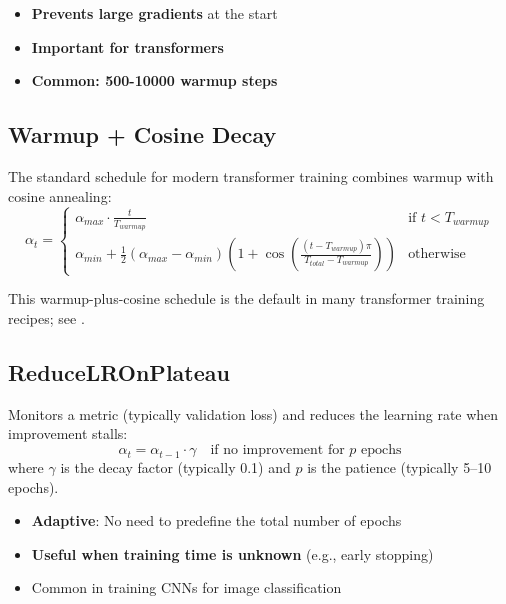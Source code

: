 \begin{itemize}
    \item \textbf{Prevents large gradients} at the start
    \item \textbf{Important for transformers}
    \item \textbf{Common: 500-10000 warmup steps}
\end{itemize}

\subsection{Warmup + Cosine Decay}

The standard schedule for modern transformer training combines warmup with cosine annealing:
\begin{equation}
\alpha_t = \begin{cases}
\alpha_{max} \cdot \frac{t}{T_{warmup}} & \text{if } t < T_{warmup} \\
\alpha_{min} + \frac{1}{2}(\alpha_{max} - \alpha_{min})\left(1 + \cos\left(\frac{(t - T_{warmup})\pi}{T_{total} - T_{warmup}}\right)\right) & \text{otherwise}
\end{cases}
\end{equation}

This warmup-plus-cosine schedule is the default in many transformer training recipes; see \cite{loshchilov2016sgdr,goyal2017accurate}.

\subsection{ReduceLROnPlateau}

Monitors a metric (typically validation loss) and reduces the learning rate when improvement stalls:
\begin{equation}
\alpha_t = \alpha_{t-1} \cdot \gamma \quad \text{if } \text{no improvement for } p \text{ epochs}
\end{equation}
where $\gamma$ is the decay factor (typically 0.1) and $p$ is the patience (typically 5--10 epochs).

\begin{itemize}
    \item \textbf{Adaptive}: No need to predefine the total number of epochs
    \item \textbf{Useful when training time is unknown} (e.g., early stopping)
    \item Common in training CNNs for image classification
\end{itemize}

